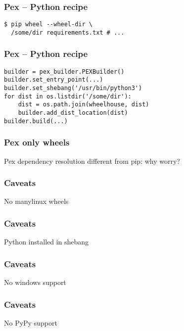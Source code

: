 \begin{frame}[fragile]
\frametitle{Pex -- Python recipe}
\begin{lstlisting}
$ pip wheel --wheel-dir \
  /some/dir requirements.txt # ...
\end{lstlisting}
\end{frame}

\begin{frame}[fragile]
\frametitle{Pex -- Python recipe}
\begin{lstlisting}
builder = pex_builder.PEXBuilder()
builder.set_entry_point(...)
builder.set_shebang('/usr/bin/python3')
for dist in os.listdir('/some/dir'):
    dist = os.path.join(wheelhouse, dist)
    builder.add_dist_location(dist)
builder.build(...)
\end{lstlisting}
\end{frame}

\begin{frame}[fragile]
\frametitle{Pex only wheels}
Pex dependency resolution different from pip:
why worry?
\end{frame}

\begin{frame}[fragile]
\frametitle{Caveats}
No manylinux wheels
\end{frame}

\begin{frame}[fragile]
\frametitle{Caveats}
Python installed in shebang
\end{frame}

\begin{frame}[fragile]
\frametitle{Caveats}
No windows support
\end{frame}

\begin{frame}[fragile]
\frametitle{Caveats}
No PyPy support
\end{frame}


